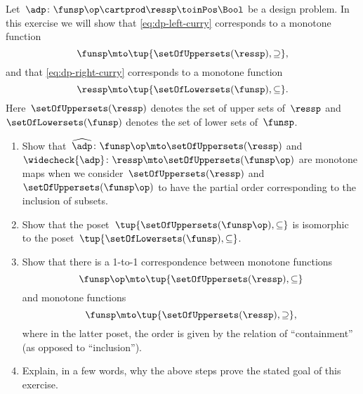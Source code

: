 \begin{gradedexercise}
    \label{ex:CurryingDesignProblems}
    Let~$\adp\colon \funsp\op \cartprod \ressp\toinPos \Bool$ be a design problem.
    In this exercise we will show that \cref{eq:dp-left-curry} corresponds to a monotone function
    \begin{equation}
        \funsp \mto \tup{\setOfUppersets (\ressp), \supseteq},
    \end{equation}
    and that \cref{eq:dp-right-curry} corresponds to a monotone function
    \begin{equation}
        \ressp \mto \tup{\setOfLowersets(\funsp), \subseteq}.
    \end{equation}
    Here~$\setOfUppersets (\ressp)$ denotes the set of upper sets of~$\ressp$ and~$\setOfLowersets(\funsp)$ denotes the set of lower sets of~$\funsp$.

    \begin{enumerate}
        \item Show that~$\widehat{\adp} \colon \funsp\op \mto \setOfUppersets (\ressp)$ and~$\widecheck{\adp} \colon \ressp \mto \setOfUppersets (\funsp\op)$ are monotone maps when we consider~$\setOfUppersets (\ressp)$ and~$\setOfUppersets (\funsp\op)$ to have the partial order corresponding to the inclusion of subsets.
        \item Show that the poset~$\tup{\setOfUppersets (\funsp\op), \subseteq}$ is isomorphic to the poset~$\tup{\setOfLowersets(\funsp), \subseteq}$.
        \item Show that there is a 1-to-1 correspondence between monotone functions
              \begin{equation}
                  \funsp\op \mto \tup{\setOfUppersets (\ressp), \subseteq}
              \end{equation}
              and monotone functions
              \begin{equation}
                  \funsp \mto \tup{\setOfUppersets (\ressp), \supseteq},
              \end{equation}
              where in the latter poset, the order is given by the relation of ``containment'' (as opposed to ``inclusion'').
        \item Explain, in a few words, why the above steps prove the stated goal of this exercise.
    \end{enumerate}
\end{gradedexercise}

